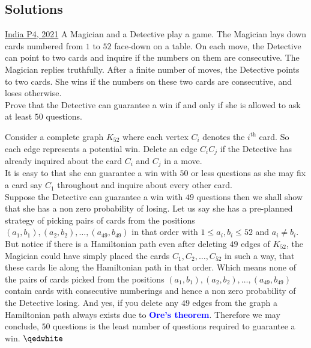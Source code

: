 \subsection{Solutions}
\begin{problem}{1}{\href{https://artofproblemsolving.com/community/q1h2478238p34659801}{India P4, 2021}} 
		A Magician and a Detective play a game. The Magician lays down cards numbered from $1$ to $52$ face-down on a table. On each move, the Detective can point to two cards and inquire if the numbers on them are consecutive. The Magician replies truthfully. After a finite number of moves, the Detective points to two cards. She wins if the numbers on these two cards are consecutive, and loses otherwise.\\
	Prove that the Detective can guarantee a win if and only if she is allowed to ask at least $50$ questions.
	\begin{solution} Consider a complete graph $K_{52}$ where each vertex $C_i$ denotes the $i^{\text{th}}$ card. So each edge represents a potential win. Delete an edge $C_iC_j$ if the Detective has already inquired about the card $C_i$ and $C_j$ in a move.\\

		\noindent{} It is easy to that she can guarantee a win with $50$ or less questions as she may fix a card say $C_1$ throughout and inquire about every other card.\\

		\noindent{} Suppose the Detective can guarantee a win with $49$ questions then we shall show that she has a non zero probability of losing. Let us say she has a pre-planned strategy of picking pairs of cards from the positions $({a_1}, {b_1}), ({a_2}, {b_2}),\ldots, ({a_{49}}, {b_{49}})$ in that order with $1\le a_i, b_i\le 52$ and $a_i\ne b_i$. But notice if there is a Hamiltonian path even after deleting $49$ edges of $K_{52}$, the Magician could have simply placed the cards $C_1,C_2,\ldots, C_{52}$ in such a way, that these cards lie along the Hamiltonian path in that order. Which means none of the pairs of cards picked from the positions $({a_1}, {b_1}), ({a_2}, {b_2}),\ldots, ({a_{49}}, {b_{49}})$ contain cards with consecutive numberings and hence a non zero probability of the Detective losing. And yes, if you delete any $49$ edges from the graph a Hamiltonian path always exists due to \textbf{\textcolor{blue}{Ore's theorem}}. Therefore we may conclude, $50$ questions is the least number of questions required to guarantee a win. $\qedwhite$

	\end{solution}
\end{problem}

